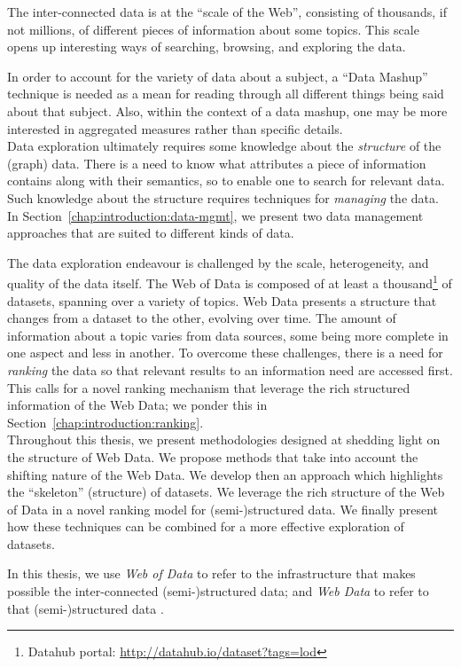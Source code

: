 The inter-connected data is at the ``scale of the Web'', consisting of thousands, if not millions, of different pieces of information about some topics. This scale opens up interesting ways of searching, browsing, and exploring the data.

In order to account for the variety of data about a subject, a ``Data Mashup'' technique is needed as a mean for reading through all different things being said about that subject. Also, within the context of a data mashup, one may be more interested in aggregated measures rather than specific details.\\

Data exploration ultimately requires some knowledge about the \emph{structure} of the (graph) data. There is a need to know what attributes a piece of information contains along with their semantics, so to enable one to search for relevant data. Such knowledge about the structure requires techniques for \emph{managing} the data. In Section~\ref{chap:introduction:data-mgmt}, we present two data management approaches that are suited to different kinds of data.

The data exploration endeavour is challenged by the scale, heterogeneity, and quality of the data itself. The Web of Data is composed of at least a thousand\footnote{Datahub portal: \url{http://datahub.io/dataset?tags=lod}} of datasets, spanning over a variety of topics. Web Data presents a structure that changes from a dataset to the other, evolving over time. The amount of information about a topic varies from data sources, some being more complete in one aspect and less in another. To overcome these challenges, there is a need for \emph{ranking} the data so that relevant results to an information need are accessed first. This calls for a novel ranking mechanism that leverage the rich structured information of the Web Data; we ponder this in Section~\ref{chap:introduction:ranking}.\\

Throughout this thesis, we present methodologies designed at shedding light on the structure of Web Data. We propose methods that take into account the shifting nature of the Web Data. We develop then an approach which highlights the ``skeleton'' (structure) of datasets. We leverage the rich structure of the Web of Data in a novel ranking model for (semi-)structured data. We finally present how these techniques can be combined for a more effective exploration of datasets.

In this thesis, we use \emph{Web of Data} to refer to the infrastructure that makes possible the inter-connected (semi-)structured data; and \emph{Web Data} to refer to that (semi-)structured data \cite{delbru:jws:entity}.

